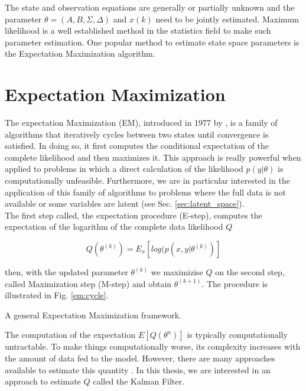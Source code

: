 \documentclass[mscthesis]{usiinfthesis}
\begin{document}
The state and observation equations are generally or partially unknown and the parameter $\theta=(A, B, \Sigma, \Delta)$ and $x(k)$ need to be jointly estimated. Maximum likelihood is a well established method in the statistics field to make such parameter estimation. One popular method to estimate state space parameters is the Expectation Maximization algorithm.


\section{Expectation Maximization}
\label{sec:em}

The expectation Maximization (EM), introduced in 1977 by \citet{paper:dempster}, is a family of algorithms that iteratively cycles between two states until convergence is satisfied. In doing so, it first computes the conditional expectation of the complete likelihood and then maximizes it. This approach is really powerful when applied to problems in which a direct calculation of the likelihood $p(y|\theta)$ is computationally unfeasible. Furthermore, we are in particular interested in the application of this family of algorithms to problems where the full data is not available or some variables are latent (see Sec. \ref{sec:latent_space}). \\

The first step called, the expectation procedure (E-step), computes the expectation of the logarithm of the complete data likelihood $Q$

\[
Q(\theta^{(k)}) = E_{x} \left[ log(p(x, y | \theta^{(k)}) \right]
\]

\noindent then, with the updated parameter $\theta^{(k)}$ we maximizise $Q$ on the second step, called Maximization step (M-step) and obtain $\theta^{(k+1)}$. The procedure is illustrated in Fig. \ref{em:cycle}. 

\begin{algorithm}[h]
  \caption{A general Expectation Maximization framework.}
  \label{eq:expectation_maximization}
\end{algorithm}

The computation of the expectation $E[Q(\theta^n)]$ is typically computationally untractable. To make things computationally worse, its complexity increases with the amount of data fed to the model. However, there are many approaches available to estimate this quantity \cite{book:EMBook}. In this thesis, we are interested in an approach to estimate $Q$ called the Kalman Filter.
\end{document}
